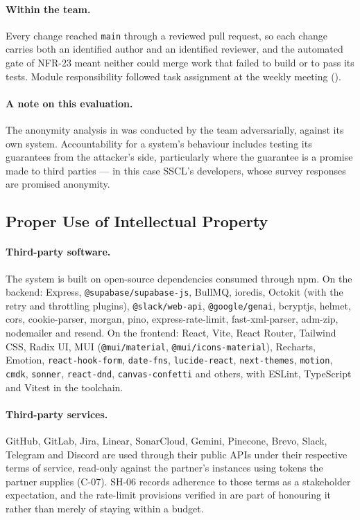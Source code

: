 \paragraph{Within the team.} Every change reached \texttt{main} through a
reviewed pull request, so each change carries both an identified author and an
identified reviewer, and the automated gate of NFR-23 meant neither could merge
work that failed to build or to pass its tests. Module responsibility followed
task assignment at the weekly meeting ().

\paragraph{A note on this evaluation.} The anonymity analysis in
 was conducted by the team adversarially, against its own
system. Accountability for a system's behaviour includes testing its guarantees
from the attacker's side, particularly where the guarantee is a promise made to
third parties --- in this case SSCL's developers, whose survey responses are
promised anonymity.

\subsection{Proper Use of Intellectual Property}
\label{subsec:ip}

\paragraph{Third-party software.} The system is built on open-source
dependencies consumed through npm. On the backend: Express,
\texttt{@supabase/supabase-js}, BullMQ, ioredis, Octokit (with the retry and
throttling plugins), \texttt{@slack/web-api}, \texttt{@google/genai}, bcryptjs,
helmet, cors, cookie-parser, morgan, pino, express-rate-limit, fast-xml-parser,
adm-zip, nodemailer and resend. On the frontend: React, Vite, React Router,
Tailwind CSS, Radix UI, MUI (\texttt{@mui/material}, \texttt{@mui/icons-material}),
Recharts, Emotion, \texttt{react-hook-form}, \texttt{date-fns},
\texttt{lucide-react}, \texttt{next-themes}, \texttt{motion}, \texttt{cmdk},
\texttt{sonner}, \texttt{react-dnd}, \texttt{canvas-confetti} and others, with
ESLint, TypeScript and Vitest in the toolchain.

\paragraph{Third-party services.} GitHub, GitLab, Jira, Linear, SonarCloud,
Gemini, Pinecone, Brevo, Slack, Telegram and Discord are used through their
public APIs under their respective terms of service, read-only against the
partner's instances using tokens the partner supplies (C-07). SH-06 records
adherence to those terms as a stakeholder expectation, and the rate-limit
provisions verified in  are part of honouring it rather than
merely of staying within a budget.

